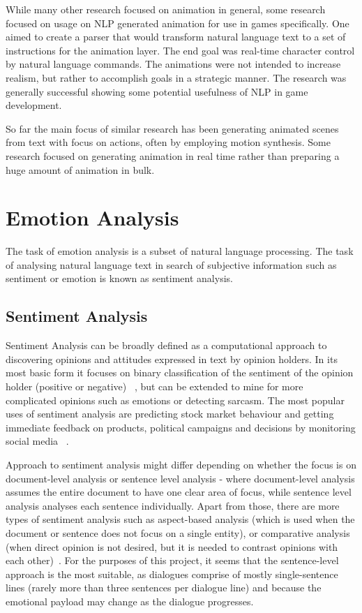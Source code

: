 While many other research focused on animation in general, some research focused on usage on NLP generated animation for use in games specifically. One aimed to create a parser that would transform natural language text to a set of instructions for the animation layer. The end goal was real-time character control by natural language commands. The animations were not intended to increase realism, but rather to accomplish goals in a strategic manner. The research was generally successful showing some potential usefulness of NLP in game development. ~\cite{animpaper3}

So far the main focus of similar research has been generating animated scenes from text with focus on actions, often by employing motion synthesis. Some research focused on generating animation in real time rather than preparing a huge amount of animation in bulk.




\section{Emotion Analysis}

The task of emotion analysis is a subset of natural language processing. The task of analysing natural language text in search of subjective information such as sentiment or emotion is known as sentiment analysis.

\subsection{Sentiment Analysis}
Sentiment Analysis can be broadly defined as a computational approach to discovering opinions and attitudes expressed in text by opinion holders. In its most basic form it focuses on binary classification of the sentiment of the opinion holder (positive or negative) ~\cite{sentimentanal1}, but can be extended to mine for more complicated opinions such as emotions or detecting sarcasm. The most popular uses of sentiment analysis are predicting stock market behaviour and getting immediate feedback on products, political campaigns and decisions by monitoring social media ~\cite{sentimentanal2}.

Approach to sentiment analysis might differ depending on whether the focus is on document-level analysis or sentence level analysis - where document-level analysis assumes the entire document to have one clear area of focus, while sentence level analysis analyses each sentence individually. Apart from those, there are more types of sentiment analysis such as aspect-based analysis (which is used when the document or sentence does not focus on a single entity), or comparative analysis (when direct opinion is not desired, but it is needed to contrast opinions with each other)~\cite{sentimentanal2}. For the purposes of this project, it seems that the sentence-level approach is the most suitable, as dialogues comprise of mostly single-sentence lines (rarely more than three sentences per dialogue line) and because the emotional payload may change as the dialogue progresses.

